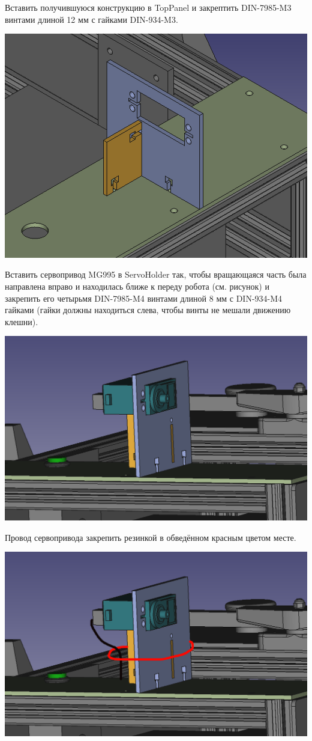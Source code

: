 \documentclass[12pt,a4paper,oneside]{article}
\begin{document}
Вставить получившуюся конструкцию в TopPanel и закрептить DIN-7985-M3 винтами
длиной 12 мм с гайками DIN-934-M3.

\includegraphics[width=\textwidth]{servoholder-toppanel}

Вставить сервопривод MG995 в ServoHolder так, чтобы вращающаяся часть была
направлена вправо и находилась ближе к переду робота (см. рисунок) и закрепить
его четырьмя DIN-7985-M4 винтами длиной 8 мм с DIN-934-M4 гайками (гайки должны
находиться слева, чтобы винты не мешали движению клешни).

\includegraphics[width=\textwidth]{installedservo}

Провод сервопривода закрепить резинкой в обведённом красным цветом месте.

\includegraphics[width=\textwidth]{servowires}
\end{document}
